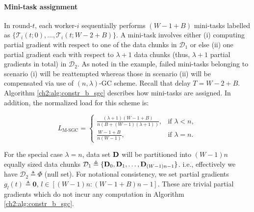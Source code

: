 

\paragraph{Mini-task assignment} In round-$t$, each worker-$i$ sequentially performs $(W-1+B)$ mini-tasks labelled as $\{\mathcal{T}_i(t;0),\ldots,\mathcal{T}_i(t;W-2+B)\}$. A mini-task involves either (i) computing partial gradient with respect to one of the data chunks in $\mathcal{D}_1$ or else (ii) one partial gradient each with respect to $\lambda+1$ data chunks (thus, $\lambda+1$ partial gradients in total) in $\mathcal{D}_2$. As noted in the example, failed mini-tasks belonging to scenario (i) will be reattempted whereas those in scenario (ii) will be compensated via use of $(n,\lambda)$-GC scheme. Recall that delay $T=W-2+B$. Algorithm \ref{ch2:alg:constr_b_sgc} describes how mini-tasks are assigned. In addition, the normalized load for this scheme is: 

\begin{equation}\label{ch2:eq:load_construction_A}
L_\text{M-SGC} = \begin{cases}
    \frac{(\lambda+1)(W-1+B)}{n(B+(W-1)(\lambda+1))}, & \text{if $\lambda < n$},\\[5pt]
    \frac{W-1+B}{n(W-1)}, & \text{if $\lambda = n$}.
\end{cases}
\end{equation}

\begin{remark}[Case of $\lambda=n$] \normalfont\label{ch2:rem:lambda_n_special_case}
    For the special case $\lambda=n$, data set $\mathbf{D}$ will be partitioned into $(W-1)n$ equally sized data chunks $\mathcal{D}_1\triangleq\{\mathbf{D}_0,\mathbf{D}_1,\ldots,\mathbf{D}_{(W-1)n-1}\}$. i.e., effectively we have $\mathcal{D}_2\triangleq\Phi$ (null set). For notational consistency, we set  partial gradients $g_{l}(t)\triangleq \mathbf{0}$, $l\in[(W-1)n:(W-1+B)n-1]$. These are trivial partial gradients which do not incur any computation in Algorithm \ref{ch2:alg:constr_b_sgc}. 
\end{remark}


